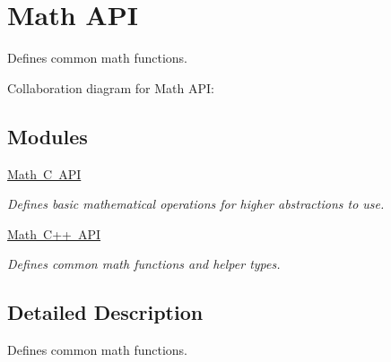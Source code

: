 \hypertarget{group__mathapi}{}\section{Math A\+PI}
\label{group__mathapi}


Defines common math functions.  


Collaboration diagram for Math A\+PI\+:
\subsection*{Modules}
\begin{DoxyCompactItemize}
\item 
\mbox{\hyperlink{group__mathcapi}{Math C A\+PI}}
\begin{DoxyCompactList}\small\item\em Defines basic mathematical operations for higher abstractions to use. \end{DoxyCompactList}\item 
\mbox{\hyperlink{group__mathcppapi}{Math C++ A\+PI}}
\begin{DoxyCompactList}\small\item\em Defines common math functions and helper types. \end{DoxyCompactList}\end{DoxyCompactItemize}


\subsection{Detailed Description}
Defines common math functions. 

